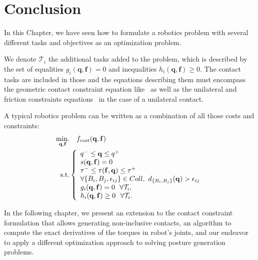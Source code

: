 \section{Conclusion}
\label{sec:Ch1_Conclusion}


In this Chapter, we have seen how to formulate a robotics problem with several different tasks and objectives as an optimization problem.

We denote $\mathcal{T}_i$ the additional tasks added to the problem, which is described by the set of equalities $g_i(\mathbf{q},\mathbf{f}) = 0$ and inequalities $h_i(\mathbf{q},\mathbf{f}) \geq 0$.
The contact tasks are included in those and the equations describing them must encompass the geometric contact constraint equation like~ as well as the unilateral and friction constraints equations~ in the case of a unilateral contact.

A typical robotics problem can be written as a combination of all those costs and constraints:
\begin{align}
\operatorname*{min.}_{\mathbf{q}, \mathbf{f}} & \quad f_\text{cost}(\mathbf{q},\mathbf{f}) \nonumber\\
\text{s.t.}&
\left\{
\begin{array}{lr}
q^- \le \mathbf{q} \le q^+\\
s(\mathbf{q},\mathbf{f}) = 0 \\
\tau^- \le \tau(\mathbf{f},\mathbf{q}) \le \tau^+\\
\forall \{B_i, B_j, \epsilon_{ij}\} \in Coll,\ d_{\{B_i, B_j\}}(\mathbf{q}) > \epsilon_{ij}\\
g_i(\mathbf{q},\mathbf{f}) = 0\ \ \forall\mathcal{T}_i,\\
h_i(\mathbf{q},\mathbf{f}) \geq 0\ \ \forall\mathcal{T}_i.
\end{array}\right.
\label{eq:PG}
\end{align}

In the following chapter, we present an extension to the contact constraint formulation that allows generating non-inclusive contacts, an algorithm to compute the exact derivatives of the torques in robot's joints, and our endeavor to apply a different optimization approach to solving posture generation problems.
